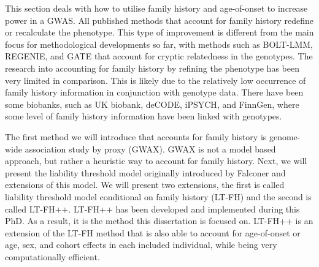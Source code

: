 
This section deals with how to utilise family history and age-of-onset to increase power in a GWAS. All published methods that account for family history redefine or recalculate the phenotype. This type of improvement is different from the main focus for methodological developments so far, with methods such as BOLT-LMM\cite{loh2015efficient}, REGENIE\cite{mbatchou2021computationally}, and GATE\cite{dey2022efficient} that account for cryptic relatedness in the genotypes. The research into accounting for family history by refining the phenotype has been very limited in comparison. This is likely due to the relatively low occurrence of family history information in conjunction with genotype data. There have been some biobanks, such as UK biobank\cite{bycroft2018uk}, deCODE\cite{noauthor_2012-jh}, iPSYCH\cite{bybjerg2020ipsych2015,pedersen2018ipsych2012}, and FinnGen\cite{Kurki2022-pt}, where some level of family history information have been linked with genotypes. 

The first method we will introduce that accounts for family history is genome-wide association study by proxy (GWAX)\cite{gwax}. GWAX is not a model based approach, but rather a heuristic way to account for family history. Next, we will present the liability threshold model originally introduced by Falconer\cite{falconer1965inheritance} and extensions of this model. We will present two extensions, the first is called liability threshold model conditional on family history (LT-FH)\cite{hujoel2020liability} and the second is called LT-FH++. LT-FH++ has been developed and implemented during this PhD. As a result, it is the method this dissertation is focused on. LT-FH++ is an extension of the LT-FH method that is also able to account for age-of-onset or age, sex, and cohort effects in each included individual, while being very computationally efficient. 

